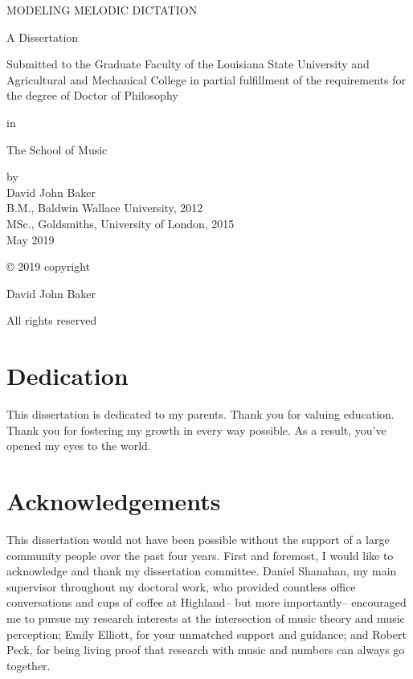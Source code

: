 \newpage\thispagestyle{empty}
\begin{center}
MODELING MELODIC DICTATION
\end{center}
\vspace{1in}
\begin{center}
A Dissertation

Submitted to the Graduate Faculty of the Louisiana State University and Agricultural and Mechanical College in partial fulfillment of the requirements for the degree of Doctor of Philosophy

in

The School of Music
\end{center}
\vspace{1in}
\begin{center}
by\\
David John Baker\\
B.M., Baldwin Wallace University, 2012\\
MSc., Goldsmiths, University of London, 2015\\
May 2019
\end{center}

\setlength{\abovedisplayskip}{-5pt}
\setlength{\abovedisplayshortskip}{-5pt}

\cleardoublepage\newpage\thispagestyle{empty}\null
\cleardoublepage\newpage\thispagestyle{empty}\null

\thispagestyle{empty}

© 2019 copyright

David John Baker

All rights reserved

\cleardoublepage\newpage

\thispagestyle{empty}
\chapter{Dedication}

This dissertation is dedicated to my parents.
Thank you for valuing education.
Thank you for fostering my growth in every way possible.
As a result, you've opened my eyes to the world.

\setlength{\abovedisplayskip}{-5pt}
\setlength{\abovedisplayshortskip}{-5pt}

\chapter{Acknowledgements}

This dissertation would not have been possible without the support of a large community people over the past four years.
First and foremost, I would like to acknowledge and thank my dissertation committee.
Daniel Shanahan, my main supervisor throughout my doctoral work, who provided countless office conversations and cups of coffee at Highland-- but more importantly-- encouraged me to pursue my research interests at the intersection of music theory and music perception; Emily Elliott, for your unmatched support and guidance; and Robert Peck, for being living proof that research with music and numbers can always go together.

